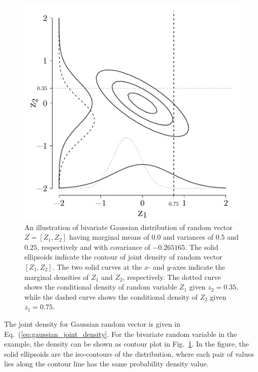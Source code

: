 \begin{figure}[bth]
	\centering
	\includegraphics[scale=0.50]{../figures/chapter4/figures/plotBivariateNormal.pdf}
	\caption[Illustration of a bivariate Gaussian distribution]{An illustration of bivariate Gaussian distribution of random vector $Z = [Z_1, Z_2]$ having marginal means of $0.0$ and variances of $0.5$ and $0.25$, respectively and with covariance of $-0.265165$. The solid ellipsoids indicate the contour of joint density of random vector $[Z_1, Z_2]$. The two solid curves at the $x$- and $y$-axes indicate the marginal densities of $Z_1$ and $Z_2$, respectively. The dotted curve shows the conditional density of random variable $Z_1$ given $z_2 = 0.35$, while the dashed curve shows the conditional density of $Z_2$ given $z_1 = 0.75$.}
	\label{fig:plot_bivariate_normal}
\end{figure}

The joint density for Gaussian random vector is given in Eq.~(\ref{eq:gaussian_joint_density}.
For the bivariate random variable in the example, the density can be shown as contour plot in Fig.~\ref{fig:plot_bivariate_normal}.
In the figure, the solid ellipsoids are the iso-contours of the distribution, where each pair of values lies along the contour line has the same probability density value.

